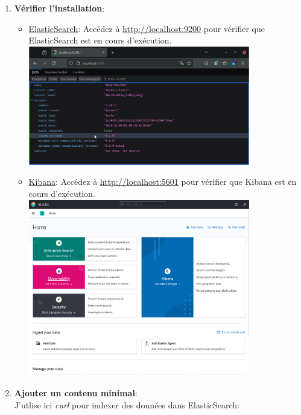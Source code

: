 \documentclass[a4paper,11pt]{article}
\begin{document}
\begin{enumerate}
                \item \textbf{Vérifier l'installation}:
                    \begin{itemize}
                        \item \underline{ElasticSearch}:  Accédez à \url{http://localhost:9200} pour vérifier que ElasticSearch est en cours d'exécution.\\
                            \bigskip
                            \includegraphics[width=0.8\textwidth]{CHAPITRE-4/4.3-BONUS/screenshots/screen3.png}
                        \item \underline{Kibana}:  Accédez à \url{http://localhost:5601} pour vérifier que Kibana est en cours d'exécution.\\
                            \bigskip
                            \includegraphics[width=0.8\textwidth]{CHAPITRE-4/4.3-BONUS/screenshots/screen4.png}
                    \end{itemize}
                \item \textbf{Ajouter un contenu minimal}: \\
                    \noindent J'utlise ici \textit{curl} pour indexer des données dans ElasticSearch:

\end{enumerate}
\end{document}
